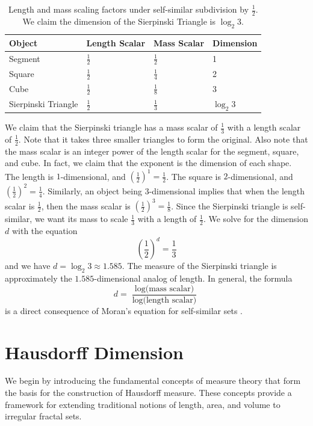 \documentclass{article}
\begin{document}
\begin{table}[h!]
\centering
\renewcommand{\arraystretch}{1.4}
\begin{tabular}{l|l|l|l}
Object & Length Scalar & Mass Scalar & Dimension\\\hline
Segment & $\frac{1}{2}$ & $\frac{1}{2}$ & 1\\
Square & $\frac{1}{2}$ & $\frac{1}{4}$ & 2\\
Cube & $\frac{1}{2}$ & $\frac{1}{8}$ & 3\\
Sierpinski Triangle & $\frac{1}{2}$ & $\frac{1}{3}$ & $\log_2 3$
\end{tabular}
\caption{\label{tab:widgets}\centering Length and mass scaling factors under self-similar subdivision by $\frac{1}{2}$. We claim the dimension of the Sierpinski Triangle is $\log_2 3$.}
\end{table}

We claim that the Sierpinski triangle has a mass scalar of $\frac{1}{3}$ with a length scalar of $\frac{1}{2}$. Note that it takes three smaller triangles to form the original. Also note that the mass scalar is an integer power of the length scalar for the segment, square, and cube. In fact, we claim that the exponent is the dimension of each shape. The length is $1$-dimensional, and $(\frac{1}{2})^1 = \frac{1}{2}$. The square is $2$-dimensional, and $(\frac{1}{2})^2 = \frac{1}{4}$. Similarly, an object being $3$-dimensional implies that when the length scalar is $\frac{1}{2}$, then the mass scalar is $(\frac{1}{2})^3 = \frac{1}{8}$. Since the Sierpinski triangle is self-similar, we want its mass to scale $\frac{1}{3}$ with a length of $\frac{1}{2}$. We solve for the dimension $d$ with the equation $$\left(\frac{1}{2}\right)^d = \frac{1}{3}$$
and we have $d=\log_2 3 \approx 1.585$. The measure of the Sierpinski triangle is approximately the $1.585$-dimensional analog of length. In general, the formula $$d = \frac{\log \text{(mass scalar)}}{\log \text{(length scalar)}}$$ is a direct consequence of Moran's equation for self-similar sets \cite{falconer2014fractal}.

\section{Hausdorff Dimension}

We begin by introducing the fundamental concepts of measure theory that form the basis for the construction of Hausdorff measure. These concepts provide a framework for extending traditional notions of length, area, and volume to irregular fractal sets.
\end{document}
